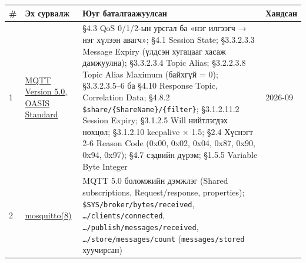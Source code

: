 \begingroup\scriptsize\begin{longtable}[]{@{}llll@{}}
\toprule
\begin{minipage}[b]{0.22\columnwidth}\raggedright
\#\strut
\end{minipage} & \begin{minipage}[b]{0.22\columnwidth}\raggedright
Эх сурвалж\strut
\end{minipage} & \begin{minipage}[b]{0.22\columnwidth}\raggedright
Юуг баталгаажуулсан\strut
\end{minipage} & \begin{minipage}[b]{0.22\columnwidth}\raggedright
Хандсан\strut
\end{minipage}\tabularnewline
\midrule
\endhead
\begin{minipage}[t]{0.22\columnwidth}\raggedright
1\strut
\end{minipage} & \begin{minipage}[t]{0.22\columnwidth}\raggedright
\href{https://docs.oasis-open.org/mqtt/mqtt/v5.0/mqtt-v5.0.html}{MQTT Version 5.\allowbreak{}0, OASIS Standard}\strut
\end{minipage} & \begin{minipage}[t]{0.22\columnwidth}\raggedright
§4.3 QoS 0/1/2-ын урсгал ба «нэг илгээгч → нэг хүлээн авагч»; §4.1 Session State; §3.3.2.3.3 Message Expiry (үлдсэн хугацааг хасаж дамжуулна); §3.3.2.3.4 Topic Alias; §3.2.2.3.8 Topic Alias Maximum (байхгүй = 0); §3.3.2.3.5--6 ба §4.10 Response Topic, Correlation Data; §4.8.2 \texttt{\$share/\allowbreak{}\{ShareName\}/\{filter\}}; §3.1.2.11.2 Session Expiry; §3.1.2.5 Will нийтлэгдэх нөхцөл; §3.1.2.10 keepalive × 1.5; §2.4 Хүснэгт 2-6 Reason Code (0x00, 0x02, 0x04, 0x87, 0x90, 0x94, 0x97); §4.7 сэдвийн дүрэм; §1.5.5 Variable Byte Integer\strut
\end{minipage} & \begin{minipage}[t]{0.22\columnwidth}\raggedright
2026-09\strut
\end{minipage}\tabularnewline
\begin{minipage}[t]{0.22\columnwidth}\raggedright
2\strut
\end{minipage} & \begin{minipage}[t]{0.22\columnwidth}\raggedright
\href{https://mosquitto.org/man/mosquitto-8.html}{mosquitto(8)}\strut
\end{minipage} & \begin{minipage}[t]{0.22\columnwidth}\raggedright
MQTT 5.0 боломжийн дэмжлэг (Shared subscriptions, Request/response, properties); \texttt{\$SYS/\allowbreak{}broker/\allowbreak{}bytes/\allowbreak{}received}, \texttt{\ldots{}/\allowbreak{}clients/\allowbreak{}connected}, \texttt{\ldots{}/\allowbreak{}publish/\allowbreak{}messages/\allowbreak{}received}, \texttt{\ldots{}/\allowbreak{}store/\allowbreak{}messages/\allowbreak{}count} (\texttt{messages/stored} хуучирсан)\strut

\end{minipage}
\end{longtable}
